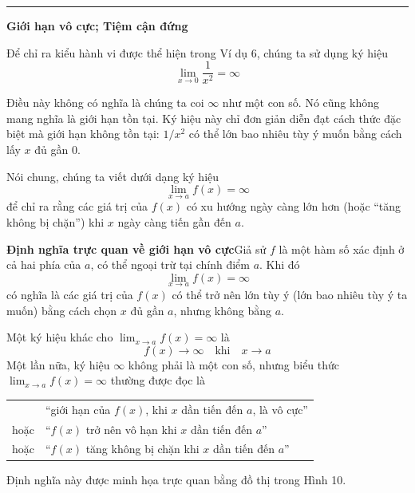 \begin{minipage}[t]{0.71\textwidth}
    \vspace{0.6em}
    {\color{stewartcyan}\rule{1.1ex}{1.1ex}}\hspace{0.5em}\textbf{\textsf{\large Giới hạn vô cực; Tiệm cận đứng}}

    \vspace{0.2em}
    Để chỉ ra kiểu hành vi được thể hiện trong Ví dụ 6, chúng ta sử dụng ký hiệu
    \[
    \lim_{x \to 0} \frac{1}{x^2} = \infty
    \]

    \noindent\llap{\cautionicon\hspace{0.8em}}Điều này không có nghĩa là chúng ta coi $\infty$ như một con số. Nó cũng không mang nghĩa là giới hạn tồn tại. Ký hiệu này chỉ đơn giản diễn đạt cách thức đặc biệt mà giới hạn không tồn tại: $1/x^2$ có thể lớn bao nhiêu tùy ý muốn bằng cách lấy $x$ đủ gần $0$.

    \vspace{0.2em}
    Nói chung, chúng ta viết dưới dạng ký hiệu
    \[
    \lim_{x \to a} f(x) = \infty
    \]
    để chỉ ra rằng các giá trị của $f(x)$ có xu hướng ngày càng lớn hơn (hoặc ``tăng không bị chặn'') khi $x$ ngày càng tiến gần đến $a$.

    \vspace{0.4em}
    \begin{definitionbox}
    \hspace{0.5em}\textbf{\textsf{\color{stewartred}Định nghĩa trực quan về giới hạn vô cực}}\hspace{0.8em}Giả sử $f$ là một hàm số xác định ở cả hai phía của $a$, có thể ngoại trừ tại chính điểm $a$. Khi đó
    \[
    \lim_{x \to a} f(x) = \infty
    \]
    có nghĩa là các giá trị của $f(x)$ có thể trở nên lớn tùy ý (lớn bao nhiêu tùy ý ta muốn) bằng cách chọn $x$ đủ gần $a$, nhưng không bằng $a$.
    \end{definitionbox}

    \vspace{0.4em}
    Một ký hiệu khác cho $\displaystyle\lim_{x \to a} f(x) = \infty$ là
    \[
    f(x) \to \infty \quad \text{khi} \quad x \to a
    \]
    Một lần nữa, ký hiệu $\infty$ không phải là một con số, nhưng biểu thức $\displaystyle\lim_{x \to a} f(x) = \infty$ thường được đọc là
    \begin{center}
    \renewcommand{\arraystretch}{1.25}
    \begin{tabular}{ll}
     & ``giới hạn của $f(x)$, khi $x$ dần tiến đến $a$, là vô cực'' \\
    hoặc & ``$f(x)$ trở nên vô hạn khi $x$ dần tiến đến $a$'' \\
    hoặc & ``$f(x)$ tăng không bị chặn khi $x$ dần tiến đến $a$''
    \end{tabular}
    \end{center}

    \vspace{0.2em}
    Định nghĩa này được minh họa trực quan bằng đồ thị trong Hình 10.
\end{minipage}
